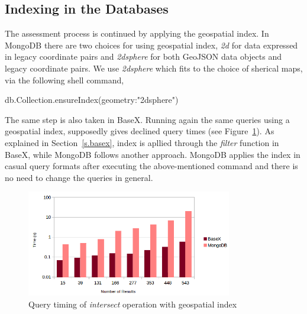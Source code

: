 \documentclass[a4paper,12pt]{article}
\begin{document}
\subsection{Indexing in the Databases}
\label{index}
The assessment process is continued by applying the geospatial index. In MongoDB there are two choices for using geospatial index, \textit{2d} for data expressed in legacy coordinate pairs and \textit{2dsphere} for both GeoJSON data objects and legacy coordinate pairs. We use \textit{2dsphere} which fits to the choice of sherical maps, via the following shell command,
\vspace{10px}
\begin{fakeJSON}
db.Collection.ensureIndex({geometry:"2dsphere"}) 
\end{fakeJSON}
\vspace{10px}
The same step is also taken in BaseX. Running again the same queries using a geospatial index, supposedly gives declined query times (see Figure~\ref{figBXvsMongoIndexIntersects}). As explained in Section~\ref{s.basex}, index is apllied through the \textit{filter} function in BaseX, while MongoDB follows another approach. MongoDB applies the index in casual query formats after executing the above-mentioned command and there is no need to change the queries in general. 


\begin{figure}
\centering
\includegraphics[width=0.8\textwidth]{BXvsMongo-Intersects-Index-Sec-log}
\caption{Query timing of \textit{intersect} operation with geospatial index}
\label{figBXvsMongoIndexIntersects}
\end{figure}

\end{document}
